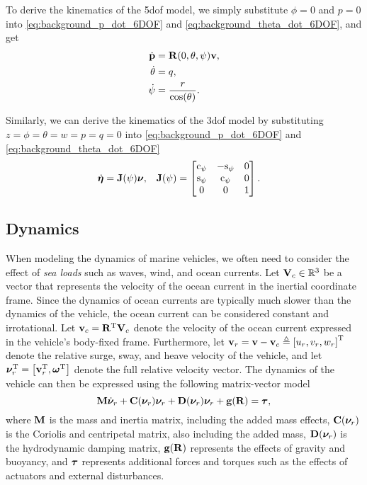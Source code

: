 To derive the kinematics of the 5\gls{dof} model, we simply substitute $\phi = 0$ and $p = 0$ into \eqref{eq:background_p_dot_6DOF} and \eqref{eq:background_theta_dot_6DOF}, and get
\begin{subequations}
    \begin{align}
        \dot{\mathbf{p}} &= \mathbf{R}(0, \theta, \psi) \mathbf{v}, \\
        \dot{\theta} &= q, \\
        \dot{\psi} &= \frac{r}{\cos(\theta)}.
    \end{align}
\end{subequations}

Similarly, we can derive the kinematics of the 3\gls{dof} model by substituting $z = \phi = \theta = w = p = q = 0$ into \eqref{eq:background_p_dot_6DOF} and \eqref{eq:background_theta_dot_6DOF}
\begin{align}
    \dot{\bm{\eta}} &= \mathbf{J}(\psi) \bm{\nu}, &
    \mathbf{J}(\psi) &=
    \begin{bmatrix}
        {\rm c}_{\psi} & -{\rm s}_{\psi} & 0 \\
        {\rm s}_{\psi} & {\rm c}_{\psi} & 0 \\
        0 & 0 & 1
    \end{bmatrix}.
\end{align}

\subsection{Dynamics}
When modeling the dynamics of marine vehicles, we often need to consider the effect of \emph{sea loads} such as waves, wind, and ocean currents.
Let $\mathbf{V}_c \in \mathbb{R}^3$ be a vector that represents the velocity of the ocean current in the inertial coordinate frame.
Since the dynamics of ocean currents are typically much slower than the dynamics of the vehicle, the ocean current can be considered constant and irrotational.
Let $\mathbf{v}_c = \mathbf{R}^{\mathrm{T}} \mathbf{V}_c$ denote the velocity of the ocean current expressed in the vehicle's body-fixed frame.
Furthermore, let $\mathbf{v}_r = \mathbf{v} - \mathbf{v}_c \triangleq \left[u_r, v_r, w_r\right]^{\mathrm{T}}$ denote the relative surge, sway, and heave velocity of the vehicle, and let $\bm{\nu}_r^{\mathrm{T}} = \left[\mathbf{v}_r^{\mathrm{T}}, \bm{\omega}^{\mathrm{T}}\right]$ denote the full relative velocity vector.
The dynamics of the vehicle can then be expressed using the following matrix-vector model \cite{fossen_handbook_2011}
\begin{equation}
    \mathbf{M} \dot{\bm{\nu}}_r + \mathbf{C}(\bm{\nu}_r)\bm{\nu}_r + \mathbf{D}(\bm{\nu}_r)\bm{\nu}_r + \mathbf{g}(\mathbf{R}) = \bm{\tau},
    \label{eq:background_nu_dot_relative}
\end{equation}
where $\mathbf{M}$ is the mass and inertia matrix, including the added mass effects, $\mathbf{C}(\bm{\nu}_r)$ is the Coriolis and centripetal matrix, also including the added mass, $\mathbf{D}(\bm{\nu}_r)$ is the hydrodynamic damping matrix, $\mathbf{g}(\mathbf{R})$ represents the effects of gravity and buoyancy, and $\bm{\tau}$ represents additional forces and torques such as the effects of actuators and external disturbances.

